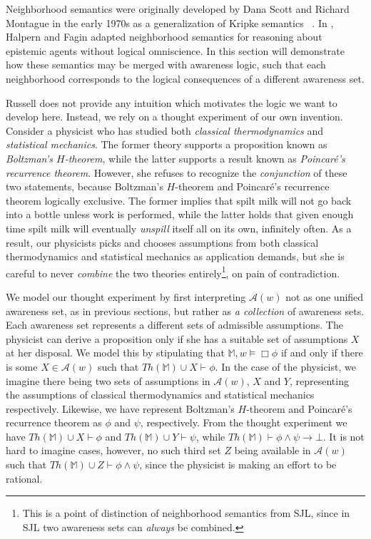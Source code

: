 Neighborhood semantics were originally developed by Dana Scott and Richard
Montague in the early 1970s as a generalization of Kripke semantics \
{\cite{montague_universal_2008,scott_advice_1970}}.  In
{\cite{fagin_belief_1988}}, Halpern and Fagin adapted neighborhood semantics
for reasoning about epistemic agents without logical omniscience.  In this
section will demonstrate how these semantics may be merged with
awareness logic, such that each neighborhood corresponds to the
logical consequences of a different
awareness set.  

Russell does not provide any intuition which motivates the logic we
want to develop here.  
Instead, we rely on a thought experiment of our own invention. Consider
a physicist who has studied both \emph{classical thermodynamics} and
\emph{statistical mechanics}.  The former theory supports a proposition
known as \emph{Boltzman's $H$-theorem}, while the latter supports 
a result known as \emph{Poincar\'{e}'s recurrence theorem}.
  However, she refuses to recognize the \emph{conjunction} of these
  two statements, because Boltzman's
  $H$-theorem and Poincar\'{e}'s recurrence theorem logically exclusive.
  The former implies that spilt milk will not go back into a bottle
  unless work is performed, while the latter holds that given enough
  time spilt milk will eventually \emph{unspill} itself all on its
  own, infinitely often.  As a result, our
  physicists picks and chooses assumptions from both classical
  thermodynamics and statistical mechanics as application
  demands, but she is careful to never \emph{combine} the two theories
  entirely\footnote{This is a point of distinction of neighborhood
    semantics from SJL, since in SJL two awareness sets can
    \emph{always} be combined.}, on pain of contradiction.
  
  We model our thought experiment by first interpreting
  $\mathcal{A}(w)$ not as one
  unified awareness set, as in previous sections, but rather as
  \emph{a collection} of awareness sets.  Each awareness set
  represents a different sets
  of admissible assumptions.  The physicist can derive a
  proposition only if she has a suitable set of assumptions $X$ at her
  disposal.  We model this by stipulating that 
  $\mathbb{M},w\models \Box \phi$ if and only if there is some 
  $X \in \mathcal{A}(w)$ such that $Th(\mathbb{M}) \cup
  X \vdash \phi$.  In the case of the physicist, we imagine there
  being two sets of assumptions in $\mathcal{A}(w)$, $X$ and $Y$,
  representing the assumptions of classical thermodynamics
  and statistical mechanics respectively.  Likewise, we have represent
  Boltzman's $H$-theorem and Poincar\'{e}'s recurrence theorem as
  $\phi$ and $\psi$, respectively.  From the thought experiment we have $Th(\mathbb{M}) \cup
  X \vdash \phi$ and $Th(\mathbb{M}) \cup
  Y \vdash \psi$, while $Th(\mathbb{M})\vdash \phi \wedge \psi \to
  \bot$.  
  It is not hard to imagine cases, however, no such third set
  $Z$ being available in $\mathcal{A}(w)$ such that $Th(\mathbb{M}) \cup
  Z \vdash \phi \wedge \psi$, since the physicist is making an effort
  to be rational.

